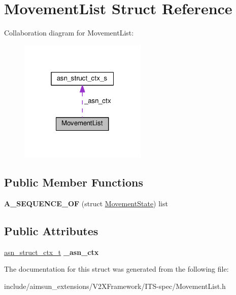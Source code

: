 \hypertarget{structMovementList}{}\section{Movement\+List Struct Reference}
\label{structMovementList}


Collaboration diagram for Movement\+List\+:\nopagebreak
\begin{figure}[H]
\begin{center}
\leavevmode
\includegraphics[width=172pt]{structMovementList__coll__graph}
\end{center}
\end{figure}
\subsection*{Public Member Functions}
\begin{DoxyCompactItemize}
\item 
{\bfseries A\+\_\+\+S\+E\+Q\+U\+E\+N\+C\+E\+\_\+\+OF} (struct \hyperlink{structMovementState}{Movement\+State}) list\hypertarget{structMovementList_ab7983dfd83a78c2e8fd23cb05e20ed74}{}\label{structMovementList_ab7983dfd83a78c2e8fd23cb05e20ed74}

\end{DoxyCompactItemize}
\subsection*{Public Attributes}
\begin{DoxyCompactItemize}
\item 
\hyperlink{structasn__struct__ctx__s}{asn\+\_\+struct\+\_\+ctx\+\_\+t} {\bfseries \+\_\+asn\+\_\+ctx}\hypertarget{structMovementList_ac7668a85215f703a4f6d4cbace8b2393}{}\label{structMovementList_ac7668a85215f703a4f6d4cbace8b2393}

\end{DoxyCompactItemize}


The documentation for this struct was generated from the following file\+:\begin{DoxyCompactItemize}
\item 
include/aimsun\+\_\+extensions/\+V2\+X\+Framework/\+I\+T\+S-\/spec/Movement\+List.\+h\end{DoxyCompactItemize}
